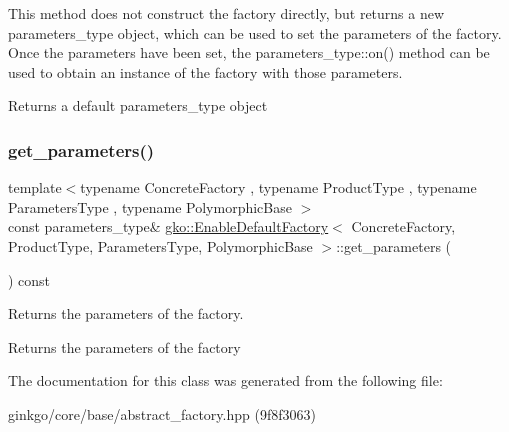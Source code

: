 This method does not construct the factory directly, but returns a new parameters\+\_\+type object, which can be used to set the parameters of the factory. Once the parameters have been set, the parameters\+\_\+type\+::on() method can be used to obtain an instance of the factory with those parameters.

\begin{DoxyReturn}{Returns}
a default parameters\+\_\+type object 
\end{DoxyReturn}
\mbox{\label{classgko_1_1EnableDefaultFactory_ae32f2b3100640293f3a46e1280965162}} 
\subsubsection{\texorpdfstring{get\+\_\+parameters()}{get\_parameters()}}
{\footnotesize\ttfamily template$<$typename Concrete\+Factory , typename Product\+Type , typename Parameters\+Type , typename Polymorphic\+Base $>$ \\
const parameters\+\_\+type\& \hyperlink{classgko_1_1EnableDefaultFactory}{gko\+::\+Enable\+Default\+Factory}$<$ Concrete\+Factory, Product\+Type, Parameters\+Type, Polymorphic\+Base $>$\+::get\+\_\+parameters (\begin{DoxyParamCaption}{ }\end{DoxyParamCaption}) const\hspace{0.3cm}{\ttfamily [noexcept]}}



Returns the parameters of the factory. 

\begin{DoxyReturn}{Returns}
the parameters of the factory 
\end{DoxyReturn}


The documentation for this class was generated from the following file\+:\begin{DoxyCompactItemize}
\item 
ginkgo/core/base/abstract\+\_\+factory.\+hpp (9f8f3063)\end{DoxyCompactItemize}
